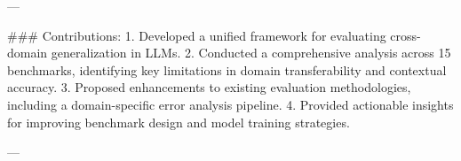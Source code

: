 ---

### Contributions:
1. Developed a unified framework for evaluating cross-domain generalization in LLMs.
2. Conducted a comprehensive analysis across 15 benchmarks, identifying key limitations in domain transferability and contextual accuracy.
3. Proposed enhancements to existing evaluation methodologies, including a domain-specific error analysis pipeline.
4. Provided actionable insights for improving benchmark design and model training strategies.

---